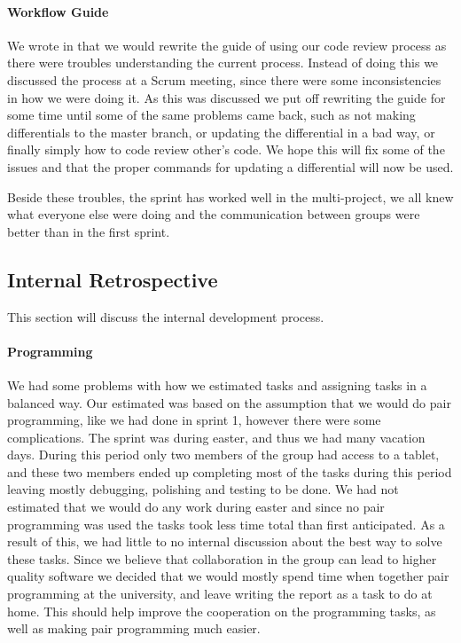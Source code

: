 \paragraph{Workflow Guide}
We wrote in  that we would rewrite the guide of using our code review process as there were troubles understanding the current process.
Instead of doing this we discussed the process at a Scrum meeting, since there were some inconsistencies in how we were doing it.
As this was discussed we put off rewriting the guide for some time until some of the same problems came back, such as not making differentials to the master branch, or updating the differential in a bad way, or finally simply how to code review other's code.
We hope this will fix some of the issues and that the proper commands for updating a differential will now be used.

Beside these troubles, the sprint has worked well in the multi-project, we all knew what everyone else were doing and the communication between groups were better than in the first sprint.
\subsection{Internal Retrospective}
This section will discuss the internal development process.
\paragraph{Programming}
We had some problems with how we estimated tasks and assigning tasks in a balanced way.
Our estimated was based on the assumption that we would do pair programming, like we had done in sprint 1, however there were some complications. 
The sprint was during easter, and thus we had many vacation days.
During this period only two members of the group had access to a tablet, and these two members ended up completing most of the tasks during this period leaving mostly debugging, polishing and testing to be done.
We had not estimated that we would do any work during easter and since no pair programming was used the tasks took less time total than first anticipated.
As a result of this, we had little to no internal discussion about the best way to solve these tasks. 
Since we believe that collaboration in the group can lead to higher quality software we decided that we would mostly spend time when together pair programming at the university, and leave writing the report as a task to do at home. 
This should help improve the cooperation on the programming tasks, as well as making pair programming much easier.

